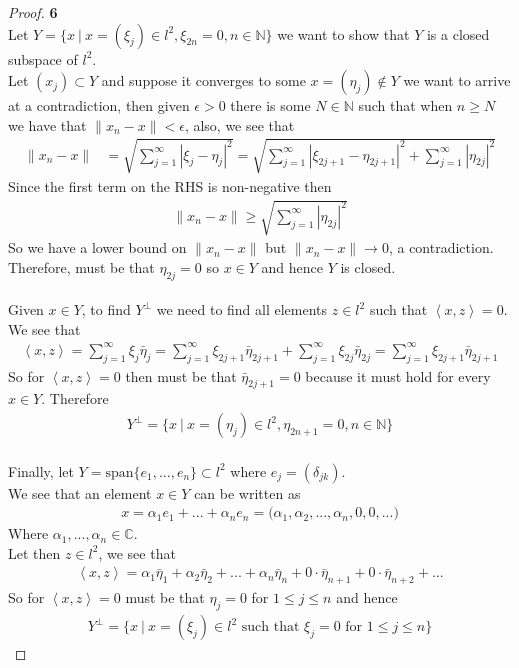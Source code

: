 \documentclass[11pt]{article}
\newcommand{\N}{\mathbb{N}}
\newcommand{\C}{\mathbb{C}}
\newcommand{\inprd}[1]{\left\langle{#1}\right\rangle}
\theoremstyle{definition}
\begin{document}
\cleardoublepage
\begin{proof}{\textbf{6}}\\
Let $Y = \{x ~|~ x=(\xi_j) \in l^2, \xi_{2n} = 0, n \in \N\}$ we want to show
that $Y$ is a closed subspace of $l^2$.
\\
Let $(x_j) \subset Y$ and suppose it converges to some
$x = (\eta_j) \not\in Y$ we want to arrive at a contradiction, then
given $\epsilon > 0$ there is some $N\in \N$ such that when $n \geq N$
we have that $\|x_n - x\| < \epsilon$, also, we see that
\begin{align*}
    \|x_n - x\| &= \sqrt{\sum_{j=1}^\infty |\xi_j - \eta_j|^2}
    = \sqrt{\sum_{j=1}^\infty |\xi_{2j + 1} - \eta_{2j + 1}|^2
    + \sum_{j=1}^\infty |\eta_{2j}|^2}
\end{align*}
Since the first term on the RHS is non-negative then
\begin{align*}
    \|x_n - x\| \geq \sqrt{\sum_{j=1}^\infty |\eta_{2j}|^2}
\end{align*}
So we have a lower bound on $\|x_n - x\|$ but $\|x_n - x\| \to 0$, a
contradiction.
\\
Therefore, must be that $\eta_{2j} = 0$ so $x \in Y$ and hence $Y$ is closed.
\\\\
Given $x \in Y$, to find $Y^\perp$ we need to find all elements $z \in l^2$
such that $\inprd{x,z} = 0$. We see that
\begin{align*}
    \inprd{x,z} = \sum_{j=1}^\infty \xi_j\bar\eta_j
    = \sum_{j=1}^\infty \xi_{2j + 1}\bar\eta_{2j + 1}
    + \sum_{j=1}^\infty \xi_{2j}\bar\eta_{2j}
    = \sum_{j=1}^\infty \xi_{2j + 1}\bar\eta_{2j + 1}
\end{align*}
So for $\inprd{x,z} = 0$ then must be that $\bar\eta_{2j + 1} = 0$ because it
must hold for every $x \in Y$. Therefore
\begin{align*}
    Y^\perp = \{x ~|~ x=(\eta_j) \in l^2, \eta_{2n + 1} = 0, n \in \N\}
\end{align*}
\\
Finally, let $Y = \text{span}\{e_1, ..., e_n\} \subset l^2$ where
$e_j = (\delta_{jk})$.
\\
We see that an element $x \in Y$ can be written as
\begin{align*}
    x = \alpha_1 e_1 + ... + \alpha_n e_n
    = \bigg(\alpha_1, \alpha_2, ..., \alpha_n, 0, 0, ...\bigg)
\end{align*}
Where $\alpha_1, ..., \alpha_n \in \C$.
\\
Let then $z \in l^2$, we see that
\begin{align*}
    \inprd{x,z}
    = \alpha_1 \bar\eta_1 + \alpha_2 \bar\eta_2 + ... + \alpha_n \bar\eta_n 
    + 0\cdot \bar\eta_{n+1} + 0\cdot \bar\eta_{n+2} + ...
\end{align*}
So for $\inprd{x,z} = 0$ must be that $\eta_j = 0$ for $1\leq j \leq n$ and
hence
\begin{align*}
    Y^\perp = \{x ~|~x = (\xi_j)\in l^2
    \text{ such that }\xi_j = 0\text{ for } 1 \leq j \leq n\}
\end{align*}
\end{proof}
\end{document}
